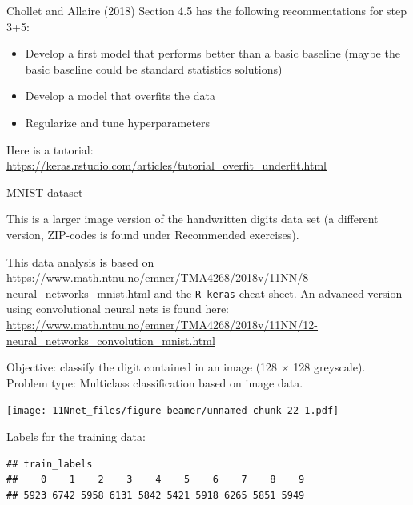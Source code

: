 \documentclass[10pt,ignorenonframetext,]{beamer}
\providecommand{\tightlist}{%
  \setlength{\itemsep}{0pt}\setlength{\parskip}{0pt}}
\begin{document}
\begin{frame}

Chollet and Allaire (2018) Section 4.5 has the following recommentations
for step 3+5:

\begin{itemize}
\tightlist
\item
  Develop a first model that performs better than a basic baseline
  (maybe the basic baseline could be standard statistics solutions)
\item
  Develop a model that overfits the data
\item
  Regularize and tune hyperparameters
\end{itemize}

Here is a tutorial:
\url{https://keras.rstudio.com/articles/tutorial_overfit_underfit.html}

\end{frame}

\begin{frame}[fragile]

\begin{block}{MNIST dataset}

This is a larger image version of the handwritten digits data set (a
different version, ZIP-codes is found under Recommended exercises).

This data analysis is based on
\url{https://www.math.ntnu.no/emner/TMA4268/2018v/11NN/8-neural_networks_mnist.html}
and the \texttt{R\ keras} cheat sheet. An advanced version using
convolutional neural nets is found here:
\url{https://www.math.ntnu.no/emner/TMA4268/2018v/11NN/12-neural_networks_convolution_mnist.html}

\end{block}

\end{frame}

\begin{frame}

Objective: classify the digit contained in an image (128 \(\times\) 128
greyscale). Problem type: Multiclass classification based on image data.

\scriptsize

\texttt{[image: 11Nnet\_files/figure-beamer/unnamed-chunk-22-1.pdf]}

\end{frame}

\begin{frame}[fragile]

Labels for the training data:

\begin{verbatim}
## train_labels
##    0    1    2    3    4    5    6    7    8    9 
## 5923 6742 5958 6131 5842 5421 5918 6265 5851 5949
\end{verbatim}

\end{frame}
\end{document}
